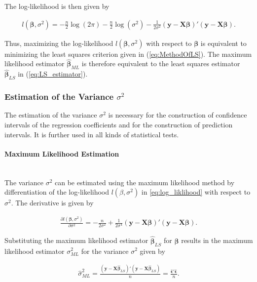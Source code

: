 \documentclass[10pt,a4paper]{article}
\newcommand{\subsubsubsection}[1]{\paragraph{#1}\mbox{}\\}
\begin{document}
The log-likelihood is then given by

\begin{align} \label{eq:log_liklihood}
	l(\boldsymbol{\beta}, \sigma^2) = -\frac{n}{2}\log(2\pi) - \frac{n}{2}\log(\sigma^2) - \frac{1}{2\sigma^2}(\boldsymbol{y} - \boldsymbol{X} \boldsymbol{\beta})'(\boldsymbol{y} - \boldsymbol{X} \boldsymbol{\beta}).
\end{align}

Thus, maximizing the log-likelihood $l(\boldsymbol{\beta}, \sigma^2)$ with respect to $\boldsymbol{\beta}$ is equivalent to minimizing the least squares criterion given in (\ref{eq:MethodOfLS}). The maximum likelihood estimator $\boldsymbol{\hat{\beta}}_{ML}$ is therefore equivalent to the least squares estimator $\boldsymbol{\hat{\beta}}_{LS}$ in (\ref{eq:LS_estimator}).

\subsubsection{Estimation of the Variance $\sigma^2$}

The estimation of the variance $\sigma^2$ is necessary for the construction of confidence intervals of the regression coefficients and for the construction of prediction intervals. It is further used in all kinds of statistical tests. \cite{blobel2013statistische}

\subsubsubsection{Maximum Likelihood Estimation}

The variance $\sigma^2$ can be estimated using the maximum likelihood method by differentiation of the log-likelihood $l(\beta, \sigma^2)$ in \ref{eq:log_liklihood} with respect to $\sigma^2$. The derivative is given by

\begin{align} \label{eq:log_likelihood_derivative_sigma}
	\frac{\partial l(\boldsymbol{\beta}, \sigma^2)}{\partial \sigma^2} = -\frac{n}{2\sigma^2} + \frac{1}{2\sigma^4}(\boldsymbol{y} - \boldsymbol{X} \boldsymbol{\beta})'(\boldsymbol{y} - \boldsymbol{X}\boldsymbol{\beta}). 
\end{align}

Substituting the maximum likelihood estimator $\boldsymbol{\hat{\beta}}_{LS}$ for $\boldsymbol{\beta}$ results in the maximum likelihood estimator $\sigma^2_{ML}$ for the variance $\sigma^2$ given by

\begin{align} \label{eq:sigma_ML}
	\hat \sigma^2_{ML} = 
		\frac{(\boldsymbol{y} - \boldsymbol{X} \boldsymbol{\hat{\beta}}_{LS})'(\boldsymbol{y} - \boldsymbol{X} \boldsymbol{\hat{\beta}}_{LS})}{n} = \frac{\boldsymbol{\hat{\epsilon}}' \boldsymbol{\hat{\epsilon}}}{n}.
\end{align}
\end{document}
